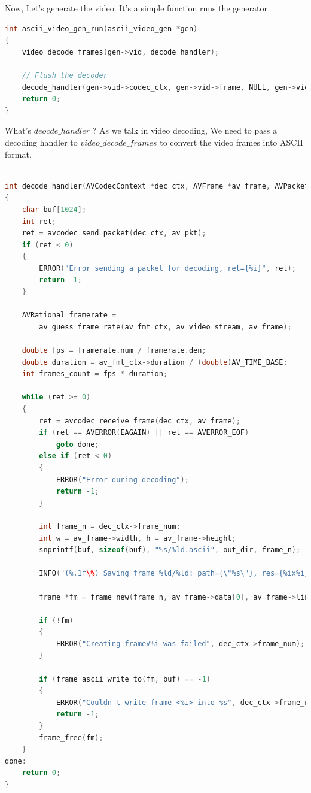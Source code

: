 \documentclass[a4paper,12pt]{article}
\begin{document}
Now, Let's generate the video. It's a simple function runs the generator 
\begin{lstlisting}[language=c]
int ascii_video_gen_run(ascii_video_gen *gen)
{
    video_decode_frames(gen->vid, decode_handler);

    // Flush the decoder
    decode_handler(gen->vid->codec_ctx, gen->vid->frame, NULL, gen->vid->fmt_ctx, gen->vid->video_stream, gen->dest);
    return 0;
}
\end{lstlisting}
\newpage
What's $deocde\_handler$ ? As we talk in video decoding, We need to pass a decoding handler to $video\_decode\_frames$ to convert the video frames into ASCII format. 

\begin{lstlisting}[language=c]

int decode_handler(AVCodecContext *dec_ctx, AVFrame *av_frame, AVPacket *av_pkt, AVFormatContext *av_fmt_ctx, AVStream *av_video_stream, const char *out_dir)
{
    char buf[1024];
    int ret;
    ret = avcodec_send_packet(dec_ctx, av_pkt);
    if (ret < 0)
    {
        ERROR("Error sending a packet for decoding, ret={%i}", ret);
        return -1;
    }

    AVRational framerate =
        av_guess_frame_rate(av_fmt_ctx, av_video_stream, av_frame);

    double fps = framerate.num / framerate.den;
    double duration = av_fmt_ctx->duration / (double)AV_TIME_BASE;
    int frames_count = fps * duration;

    while (ret >= 0)
    {
        ret = avcodec_receive_frame(dec_ctx, av_frame);
        if (ret == AVERROR(EAGAIN) || ret == AVERROR_EOF)
            goto done;
        else if (ret < 0)
        {
            ERROR("Error during decoding");
            return -1;
        }

        int frame_n = dec_ctx->frame_num;
        int w = av_frame->width, h = av_frame->height;
        snprintf(buf, sizeof(buf), "%s/%ld.ascii", out_dir, frame_n);

        INFO("(%.1f\%) Saving frame %ld/%ld: path={\"%s\"}, res={%ix%i}", frame_n / (float)frames_count * 100, frame_n, frames_count, buf, av_frame->width, av_frame->height);

        frame *fm = frame_new(frame_n, av_frame->data[0], av_frame->linesize[0], w, h);

        if (!fm)
        {
            ERROR("Creating frame#%i was failed", dec_ctx->frame_num);
        }

        if (frame_ascii_write_to(fm, buf) == -1)
        {
            ERROR("Couldn't write frame <%i> into %s", dec_ctx->frame_num, buf);
            return -1;
        }
        frame_free(fm);
    }
done:
    return 0;
}    
\end{lstlisting}
\end{document}
